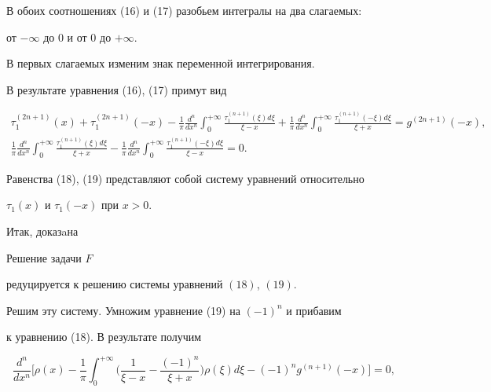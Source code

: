 В обоих соотношениях (16) и (17) разобьем интегралы на два слагаемых:


от $-\infty$ до 0 и от 0 до $+\infty$.


В первых слагаемых изменим знак переменной интегрирования.


В результате уравнения (16), (17) примут вид


\begin{gather}


\tau_1^{(2n+1)}(x) + \tau_1^{(2n+1)}(-x)-


\frac{1}{\pi}\frac{d^n}{dx^n}\int^{+\infty}_0


\frac{\tau_1^{(n+1)}(\xi)d\xi}{\xi-x}+


\frac{1}{\pi}\frac{d^n}{dx^n}\int^{+\infty}_0


\frac{\tau_1^{(n+1)}(-\xi)d\xi}{\xi+x}= g^{(2n+1)}(-x), \\


%


\frac{1}{\pi}\frac{d^n}{dx^n}\int^{+\infty}_0


\frac{\tau_1^{(n+1)}(\xi)d\xi}{\xi+x}


-\frac{1}{\pi}\frac{d^n}{dx^n}\int^{+\infty}_0


\frac{\tau_1^{(n+1)}(-\xi)d\xi}{\xi-x}= 0.


\end{gather}





Равенства (18), (19) представляют собой систему уравнений относительно


$\tau_1(x)$ и $\tau_1(-x)$ при $x>0$.


 


Итак, доказaна





\begin{thm}


Решение задачи $F$


редуцируется к решению системы уравнений $(18)$, $(19)$.


\end{thm}





Решим эту систему. Умножим уравнение (19) на $(-1)^n$ и прибавим


к уравнению (18). В результате получим


\begin{equation}


\frac{d^n}{dx^n}\biggl[\rho(x) - \frac{1}{\pi}\int


^{+\infty}_0


\biggl(\frac{1}{\xi-x}-\frac{(-1)^n}{\xi+x}\biggr)\rho(\xi)


d\xi- (-1)^ng^{(n+1)}(-x)\biggr]=0,


\end{equation}


